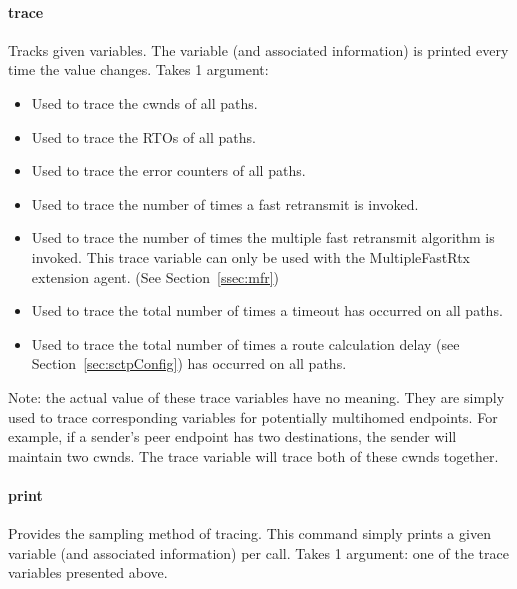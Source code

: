 	 \paragraph{trace} Tracks given variables. The variable (and associated
	 information) is printed every time the value changes. Takes 1
	 argument:
	    \begin{itemize}

	       \item[]  Used to trace the cwnds of all
	       paths. 

	       \item[]  Used to trace the RTOs of all paths.

	       \item[]  Used to trace the error counters
	       of all paths.

	       \item[]  Used to trace the number of times a
	       fast retransmit is invoked.

	       \item[]  Used to trace the number of times
	       the multiple fast retransmit algorithm is invoked. This
	       trace variable can only be used with the MultipleFastRtx
	       extension agent. (See Section~\ref{ssec:mfr})

	       \item[]  Used to trace the total number of
	       times a timeout has occurred on all paths.

	       \item[]  Used to trace the total number of
	       times a route calculation delay (see
	       Section~\ref{sec:sctpConfig}) has occurred on all paths.

	    \end{itemize}
	 Note: the actual value of these trace variables have no
	 meaning. They are simply used to trace corresponding variables
	 for potentially multihomed endpoints. For example, if a sender's
	 peer endpoint has two destinations, the sender will maintain two
	 cwnds. The  trace variable will trace both of these
	 cwnds together.

	 \paragraph{print} Provides the sampling method of tracing. This
	 command simply prints a given variable (and associated
	 information) per call.  Takes 1 argument: one of the trace
	 variables presented above.

